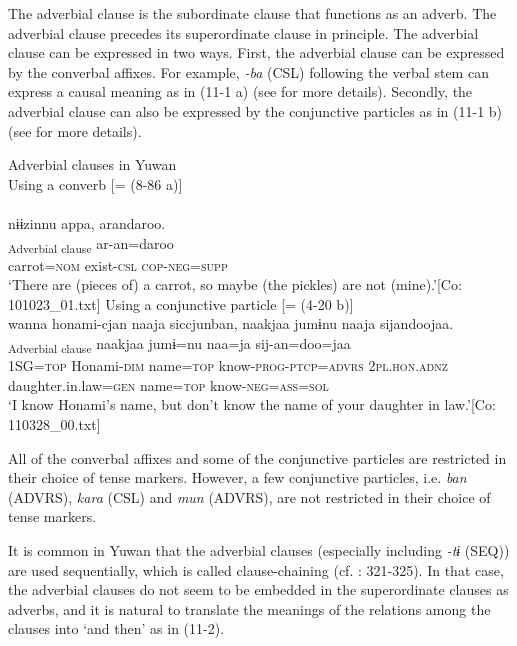 The adverbial clause is the subordinate clause that functions as an adverb. The adverbial clause precedes its superordinate clause in principle. The adverbial clause can be expressed in two ways. First, the adverbial clause can be expressed by the converbal affixes. For example, \textit{{}-ba} (CSL) following the verbal stem can express a causal meaning as in (11-1 a) (see  for more details). Secondly, the adverbial clause can also be expressed by the conjunctive particles as in (11-1 b) (see  for more details).

\ea\label{ex:11:1}
    Adverbial clauses in Yuwan\\
    \ea\label{ex:11:1a}
    Using a converb [= (8-86 a)]\\
    \\
    \glll   nɨɨzinnu appa, arandaroo.\\
            [nɨɨzin=nu ar-ba]\textsubscript{Adverbial clause} ar-an=daroo\\
            carrot\textsc{=nom} exist\textsc{-csl} \textsc{cop-neg=supp}\\
    \glt    ‘There are (pieces of) a carrot, so maybe (the pickles) are not (mine).’\hfill [Co: 101023\_01.txt]
    \ex\label{ex:11:1b}
    Using a conjunctive particle [= (4-20 b)]\\
    \glll   wanna honami-{\textbar}cjan{\textbar} naaja siccjunban, naakjaa jumɨnu naaja sijandoojaa.\\
            [wan=ja honami-cjan naa=ja sij-tur-n=ban]\textsubscript{Adverbial clause} naakjaa jumɨ=nu naa=ja sij-an=doo=jaa\\
            1SG\textsc{=top} Honami\textsc{-dim} name\textsc{=top} know\textsc{-prog-ptcp=advrs} \textsc{2pl.hon.adnz} daughter.in.law\textsc{=gen} name\textsc{=top} know\textsc{-neg=ass=sol}\\
    \glt    ‘I know Honami’s name, but don’t know the name of your daughter in law.’\hfill [Co: 110328\_00.txt]
    \z
\z

All of the converbal affixes and some of the conjunctive particles are restricted in their choice of tense markers. However, a few conjunctive particles, i.e. \textit{ban} (ADVRS), \textit{kara} (CSL) and \textit{mun} (ADVRS), are not restricted in their choice of tense markers.

It is common in Yuwan that the adverbial clauses (especially including \textit{{}-tɨ} (SEQ)) are used sequentially, which is called clause-chaining (cf. \citealt{Payne1997}: 321-325). In that case, the adverbial clauses do not seem to be embedded in the superordinate clauses as adverbs, and it is natural to translate the meanings of the relations among the clauses into ‘and then’ as in (11-2).

